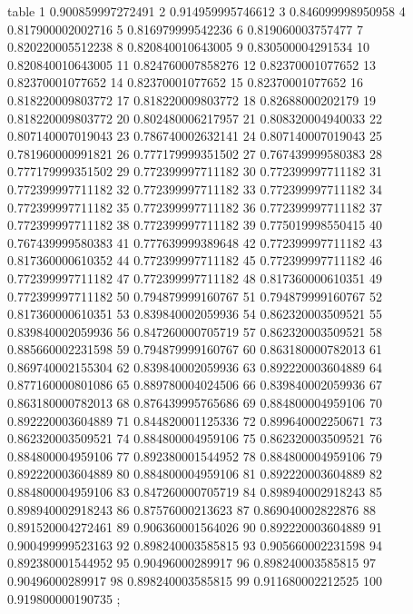 table {%
	1 0.900859997272491
	2 0.914959995746612
	3 0.846099998950958
	4 0.817900002002716
	5 0.816979999542236
	6 0.819060003757477
	7 0.820220005512238
	8 0.820840010643005
	9 0.830500004291534
	10 0.820840010643005
	11 0.824760007858276
	12 0.82370001077652
	13 0.82370001077652
	14 0.82370001077652
	15 0.82370001077652
	16 0.818220009803772
	17 0.818220009803772
	18 0.82688000202179
	19 0.818220009803772
	20 0.802480006217957
	21 0.808320004940033
	22 0.807140007019043
	23 0.786740002632141
	24 0.807140007019043
	25 0.781960000991821
	26 0.777179999351502
	27 0.767439999580383
	28 0.777179999351502
	29 0.772399997711182
	30 0.772399997711182
	31 0.772399997711182
	32 0.772399997711182
	33 0.772399997711182
	34 0.772399997711182
	35 0.772399997711182
	36 0.772399997711182
	37 0.772399997711182
	38 0.772399997711182
	39 0.775019998550415
	40 0.767439999580383
	41 0.777639999389648
	42 0.772399997711182
	43 0.817360000610352
	44 0.772399997711182
	45 0.772399997711182
	46 0.772399997711182
	47 0.772399997711182
	48 0.817360000610351
	49 0.772399997711182
	50 0.794879999160767
	51 0.794879999160767
	52 0.817360000610351
	53 0.839840002059936
	54 0.862320003509521
	55 0.839840002059936
	56 0.847260000705719
	57 0.862320003509521
	58 0.885660002231598
	59 0.794879999160767
	60 0.863180000782013
	61 0.869740002155304
	62 0.839840002059936
	63 0.892220003604889
	64 0.877160000801086
	65 0.889780004024506
	66 0.839840002059936
	67 0.863180000782013
	68 0.876439995765686
	69 0.884800004959106
	70 0.892220003604889
	71 0.844820001125336
	72 0.899640002250671
	73 0.862320003509521
	74 0.884800004959106
	75 0.862320003509521
	76 0.884800004959106
	77 0.892380001544952
	78 0.884800004959106
	79 0.892220003604889
	80 0.884800004959106
	81 0.892220003604889
	82 0.884800004959106
	83 0.847260000705719
	84 0.898940002918243
	85 0.898940002918243
	86 0.87576000213623
	87 0.869040002822876
	88 0.891520004272461
	89 0.906360001564026
	90 0.892220003604889
	91 0.900499999523163
	92 0.898240003585815
	93 0.905660002231598
	94 0.892380001544952
	95 0.90496000289917
	96 0.898240003585815
	97 0.90496000289917
	98 0.898240003585815
	99 0.911680002212525
	100 0.919800000190735
};
